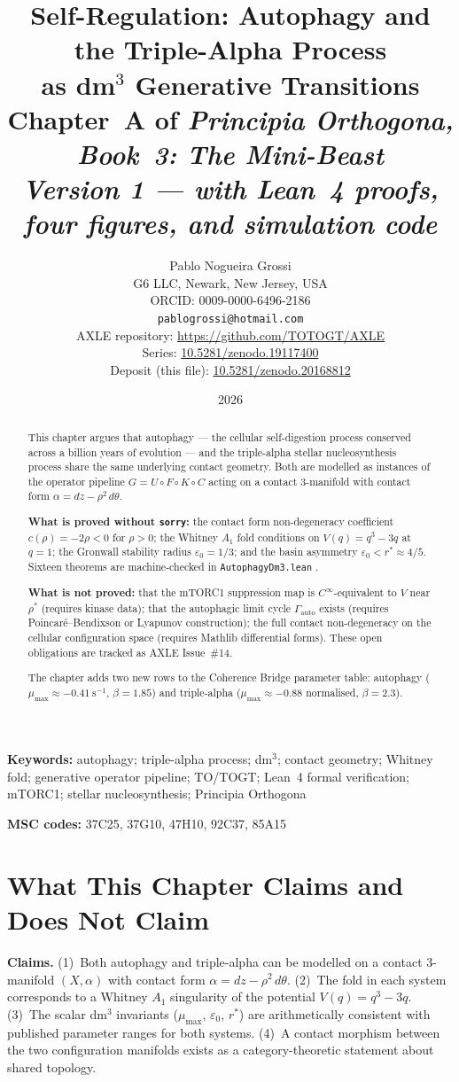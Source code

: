 \documentclass[12pt,a4paper]{article}
\title{%
  \textbf{Self-Regulation: Autophagy and the Triple-Alpha Process}\\
  \textbf{as dm$^3$ Generative Transitions}\\[0.4em]
  \large Chapter~A of \textit{Principia Orthogona, Book~3: The Mini-Beast}\\[0.3em]
  \large\emph{Version 1 --- with Lean~4 proofs, four figures, and simulation code}%
}
\author{%
  Pablo Nogueira Grossi\\
  G6 LLC, Newark, New Jersey, USA\\
  ORCID: 0009-0000-6496-2186\\
  \texttt{pablogrossi@hotmail.com}\\[0.3em]
  \small AXLE repository: \url{https://github.com/TOTOGT/AXLE}\\
  \small Series: \href{https://doi.org/10.5281/zenodo.19117400}{10.5281/zenodo.19117400}\\
  \small Deposit (this file): \href{https://doi.org/10.5281/zenodo.20168812}{10.5281/zenodo.20168812}%
}
\date{2026}
\begin{document}
\maketitle

\begin{abstract}
This chapter argues that autophagy --- the cellular self-digestion process
conserved across a billion years of evolution --- and the triple-alpha
stellar nucleosynthesis process share the same underlying contact geometry.
Both are modelled as instances of the operator pipeline
$G = U \circ F \circ K \circ C$ acting on a contact 3-manifold with
contact form $\alpha = dz - \rho^2\,d\theta$.

\textbf{What is proved without \texttt{sorry}:} the contact form
non-degeneracy coefficient $c(\rho) = -2\rho < 0$ for $\rho > 0$;
the Whitney $A_1$ fold conditions on $V(q) = q^3 - 3q$ at $q=1$;
the Gronwall stability radius $\varepsilon_0 = 1/3$; and the basin
asymmetry $\varepsilon_0 < r^* \approx 4/5$. Sixteen theorems are
machine-checked in \texttt{AutophagyDm3.lean} \cite{AXLE2026}.

\textbf{What is not proved:} that the mTORC1 suppression map is
$C^\infty$-equivalent to $V$ near $\rho^*$ (requires kinase data);
that the autophagic limit cycle $\Gamma_\mathrm{auto}$ exists
(requires Poincar\'e--Bendixson or Lyapunov construction); the full
contact non-degeneracy on the cellular configuration space
(requires Mathlib differential forms). These open obligations are
tracked as AXLE Issue~\#14.

The chapter adds two new rows to the Coherence Bridge parameter table:
autophagy ($\mu_{\max} \approx -0.41~\mathrm{s}^{-1}$, $\beta = 1.85$)
and triple-alpha ($\mu_{\max} \approx -0.88$ normalised, $\beta = 2.3$).
\end{abstract}

\textbf{Keywords:} autophagy; triple-alpha process; dm$^3$; contact
geometry; Whitney fold; generative operator pipeline; TO/TOGT;
Lean~4 formal verification; mTORC1; stellar nucleosynthesis;
Principia Orthogona

\textbf{MSC codes:} 37C25, 37G10, 47H10, 92C37, 85A15

\section{What This Chapter Claims and Does Not Claim}
\label{sec:scope}

\textbf{Claims.} (1)~Both autophagy and triple-alpha can be modelled on
a contact 3-manifold $(X, \alpha)$ with contact form
$\alpha = dz - \rho^2\,d\theta$. (2)~The fold in each system corresponds
to a Whitney $A_1$ singularity of the potential $V(q) = q^3 - 3q$. (3)~The
scalar dm$^3$ invariants ($\mu_{\max}$, $\varepsilon_0$, $r^*$) are
arithmetically consistent with published parameter ranges for both systems.
(4)~A contact morphism between the two configuration manifolds exists as a
category-theoretic statement about shared topology.
\end{document}
